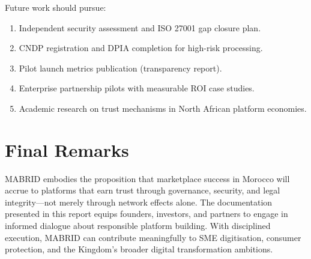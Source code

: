 Future work should pursue:
\begin{enumerate}
  \item Independent security assessment and ISO 27001 gap closure plan.
  \item CNDP registration and DPIA completion for high-risk processing.
  \item Pilot launch metrics publication (transparency report).
  \item Enterprise partnership pilots with measurable ROI case studies.
  \item Academic research on trust mechanisms in North African platform economies.
\end{enumerate}

\section{Final Remarks}

MABRID embodies the proposition that marketplace success in Morocco will accrue to platforms that earn trust through governance, security, and legal integrity---not merely through network effects alone. The documentation presented in this report equips founders, investors, and partners to engage in informed dialogue about responsible platform building. With disciplined execution, MABRID can contribute meaningfully to SME digitisation, consumer protection, and the Kingdom's broader digital transformation ambitions.

